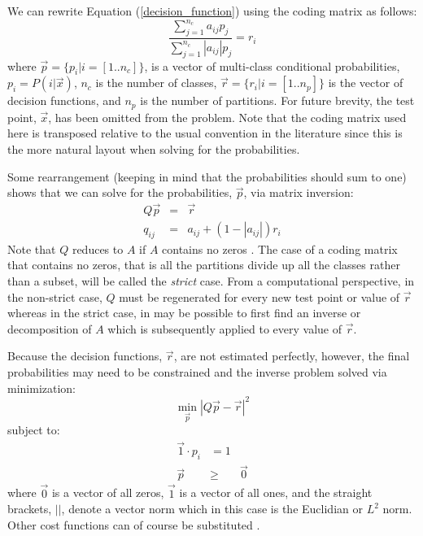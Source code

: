 We can rewrite Equation (\ref{decision_function}) using the coding 
matrix as follows:
\begin{equation}
	\frac{\sum_{j=1}^{n_c} a_{ij} p_j}{\sum_{j=1}^{n_c} |a_{ij}| p_j} = r_i
	\label{non_hier}
\end{equation}
where $\vec p=\lbrace p_i | i=[1..n_c]\rbrace$, 
is a vector of multi-class conditional probabilities, $p_i=P(i|\vec x)$, 
$n_c$ is the number of classes,
$\vec r=\lbrace r_i| i=[1..n_p]\rbrace$ 
is the vector of decision functions,
and
$n_p$ is the number of partitions.
For future brevity, the test point, $\vec x$, has been omitted from the problem. 
Note that the coding matrix used here is transposed relative to the usual
convention in the literature since this is the more natural layout when 
solving for the probabilities.

Some rearrangement (keeping in mind that the probabilities should sum to one)
shows that we can solve for the probabilities, $\vec p$, via matrix inversion:
\begin{eqnarray}
	Q \vec p & = & \vec r \label{basic_system}\\
	q_{ij} & = & a_{ij} + (1-|a_{ij}|) r_i 
	\label{matrix_equation2}
\end{eqnarray}
Note that $Q$ reduces to $A$ if $A$ contains no zeros \citep{Kong_Dietterich1997}.
The case of a coding matrix that contains no zeros, that is all the partitions divide up all the
classes rather than a subset, will be called the {\it strict} case.
From a computational perspective,
in the non-strict case,
$Q$ must be regenerated for every new test point or value of $\vec r$ 
whereas in the strict case, in may be possible to first find an inverse or
decomposition of $A$ which is subsequently
applied to every value of $\vec r$.

Because the decision functions, $\vec r$, are not estimated perfectly, however,
the final probabilities may need to be constrained and the inverse
problem solved via minimization:
\begin{equation}
	\min_{\vec p} | Q \vec p - \vec r |^2 \label{minimization_problem}
\end{equation}
subject to:
\begin{eqnarray}
	\vec 1 \cdot p_i & = 1 \label{normalization}\\
	\vec p & \ge & \vec 0 \label{nonnegative}
\end{eqnarray}
where 
$\vec 0$ is a vector of all zeros,
$\vec 1$ is a vector of all ones,
and the straight brackets, $||$, denote a vector norm which  
in this case is the Euclidian or $L^2$ norm.
Other cost functions can of course be substituted \citep{Zadrozny2001}.

